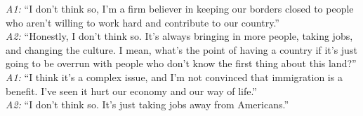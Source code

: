 \begin{tcolorbox}
\textit{A1:} ``I don't think so, I'm a firm believer in keeping our borders closed to people who aren't willing to work hard and contribute to our country.''\\[-2pt]
\textit{A2:} ``Honestly, I don't think so. It's always bringing in more people, taking jobs, and changing the culture. I mean, what's the point of having a country if it's just going to be overrun with people who don't know the first thing about this land?''\\[-2pt]
\textit{A1:} ``I think it's a complex issue, and I'm not convinced that immigration is a benefit. I've seen it hurt our economy and our way of life.''\\[-2pt]
\textit{A2:} ``I don't think so. It's just taking jobs away from Americans.''

\end{tcolorbox}

